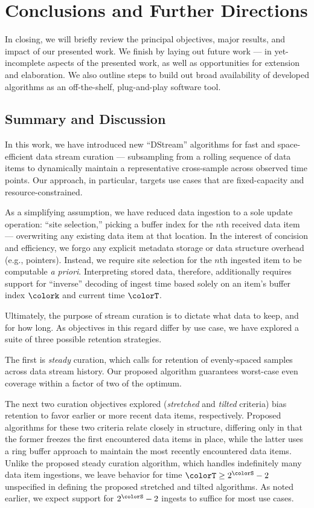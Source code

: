 \section{Conclusions and Further Directions} \label{sec:conclusion}

In closing, we will briefly review the principal objectives, major results, and impact of our presented work.
We finish by laying out future work --- in yet-incomplete aspects of the presented work, as well as opportunities for extension and elaboration.
We also outline steps to build out broad availability of developed algorithms as an off-the-shelf, plug-and-play software tool.

\subsection{Summary and Discussion}

In this work, we have introduced new ``DStream'' algorithms for fast and space-efficient data stream curation --- subsampling from a rolling sequence of data items to dynamically maintain a representative cross-sample across observed time points.
Our approach, in particular, targets use cases that are fixed-capacity and resource-constrained.

As a simplifying assumption, we have reduced data ingestion to a sole update operation: ``site selection,'' picking a buffer index for the $n$th received data item --- overwriting any existing data item at that location.
In the interest of concision and efficiency, we forgo any explicit metadata storage or data structure overhead (e.g., pointers).
Instead, we require site selection for the $n$th ingested item to be computable \textit{a priori}.
Interpreting stored data, therefore, additionally requires support for ``inverse'' decoding of ingest time based solely on an item's buffer index $\colork$ and current time $\colorT$.

Ultimately, the purpose of stream curation is to dictate what data to keep, and for how long.
As objectives in this regard differ by use case, we have explored a suite of three possible retention strategies.

The first is \textit{steady} curation, which calls for retention of evenly-spaced samples across data stream history.
Our proposed algorithm guarantees worst-case even coverage within a factor of two of the optimum.

The next two curation objectives explored (\textit{stretched} and \textit{tilted} criteria) bias retention to favor earlier or more recent data items, respectively.
Proposed algorithms for these two criteria relate closely in structure, differing only in that the former freezes the first encountered data items in place, while the latter uses a ring buffer approach to maintain the most recently encountered data items.
Unlike the proposed steady curation algorithm, which handles indefinitely many data item ingestions, we leave behavior for time $\colorT \geq 2^{\colorS} - 2$ unspecified in defining the proposed stretched and tilted algorithms.
As noted earlier, we expect support for $2^{\colorS} - 2$ ingests to suffice for most use cases.

